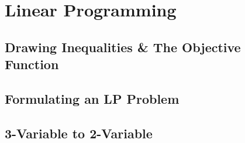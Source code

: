\documentclass[../alevelmaths.tex]{subfiles}
\begin{document}
\chapter{Linear Programming}
\section{Drawing Inequalities \& The Objective Function}
\section{Formulating an LP Problem}
\section{3-Variable to 2-Variable}
\end{document}
